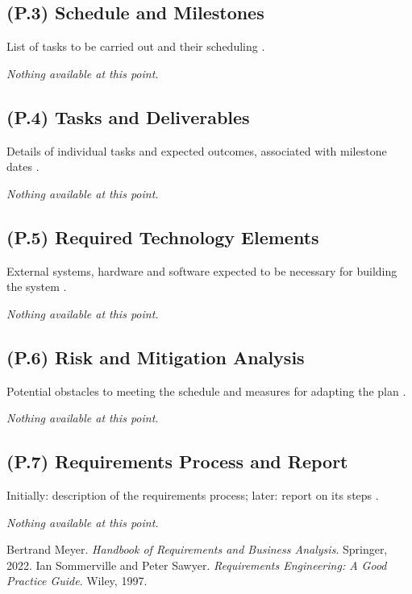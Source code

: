 \documentclass[12pt,letterpaper]{article}
\begin{document}
\subsection{(P.3) Schedule and Milestones}
List of tasks to be carried out and their scheduling \cite{meyer2022}.

\textit{Nothing available at this point.}

\subsection{(P.4) Tasks and Deliverables}
Details of individual tasks and expected outcomes, associated with milestone dates \cite{meyer2022}.

\textit{Nothing available at this point.}

\subsection{(P.5) Required Technology Elements}
External systems, hardware and software expected to be necessary for building the system \cite{meyer2022}.

\textit{Nothing available at this point.}

\subsection{(P.6) Risk and Mitigation Analysis}
Potential obstacles to meeting the schedule and measures for adapting the plan \cite{meyer2022}.

\textit{Nothing available at this point.}

\subsection{(P.7) Requirements Process and Report}
Initially: description of the requirements process; later: report on its steps \cite{meyer2022}.

\textit{Nothing available at this point.}

\clearpage

\begin{thebibliography}{9}
 Bertrand Meyer. \textit{Handbook of Requirements and Business Analysis}. Springer, 2022.
 Ian Sommerville and Peter Sawyer. \textit{Requirements Engineering: A Good Practice Guide}. Wiley, 1997.
\end{thebibliography}
\end{document}
